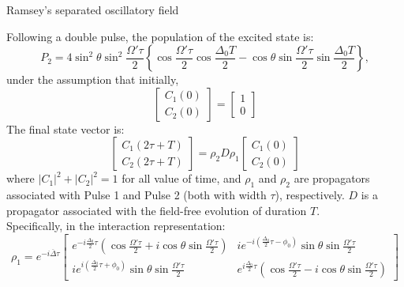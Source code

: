 \documentclass{article}
\begin{document}
\begin{center}
	\huge Ramsey's separated oscillatory field 
\end{center}	
\noindent 
Following a double pulse, the population of the excited state is:
\begin{equation*}
P_2 = 4\sin^{2}\theta\sin^{2}\frac{\Omega'\tau}{2} \left\lbrace \cos \frac{\Omega'\tau}{2}\cos \frac{\Delta_0 T}{2} - \cos\theta\sin\frac{\Omega'\tau}{2} \sin \frac{\Delta_0 T}{2}\right\rbrace, 
\end{equation*}
\noindent 
under the assumption that initially,
\[
\begin{bmatrix}
C_1(0)\\C_2(0)
\end{bmatrix}
=
\begin{bmatrix}
1\\0
\end{bmatrix}
\]
\noindent 
The final state vector is:
\[
\begin{bmatrix}
C_1(2\tau+T)\\C_2(2\tau+T)
\end{bmatrix}
=
\rho_2 D \rho_1
\begin{bmatrix}
C_1(0)\\C_2(0)
\end{bmatrix}
\]
where $|C_1|^2 + |C_2|^2 = 1$ for all value of time, and $\rho_1$ and $\rho_2$ are propagators associated with Pulse 1 and Pulse 2 (both with width $\tau$), respectively. $D$ is a propagator associated with the field-free evolution of duration $T$.\\

\noindent Specifically, in the interaction representation:
\[
\rho_1 = e^{-i\overline\Delta\tau}
\begin{bmatrix}
e^{-i\frac{\Delta_0}{2}\tau}\left(\cos\frac{\Omega'\tau}{2} + i\cos\theta\sin\frac{\Omega'\tau}{2}\right)  
& ie^{-i\left(\frac{\Delta_0}{2}\tau - \phi_0 \right)} \sin\theta\sin\frac{\Omega'\tau}{2} 
\\
ie^{i\left(\frac{\Delta_0}{2}\tau + \phi_0 \right)} \sin\theta\sin\frac{\Omega'\tau}{2} 
& 
e^{i\frac{\Delta_0}{2}\tau}\left(\cos\frac{\Omega'\tau}{2} - i\cos\theta\sin\frac{\Omega'\tau}{2}\right)  
\end{bmatrix}\]
\end{document}
